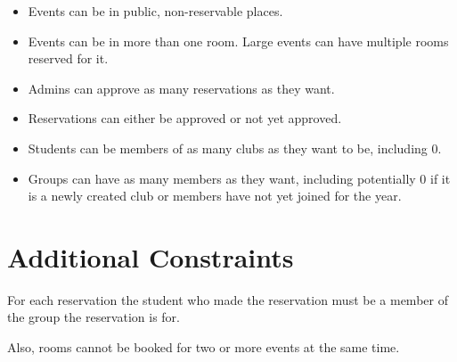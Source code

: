\documentclass{article}
\begin{document}
\begin{itemize}
\item Events can be in public, non-reservable places.
\item Events can be in more than one room. Large events can have multiple rooms
reserved for it.
\item Admins can approve as many reservations as they want.
\item Reservations can either be approved or not yet approved.
\item Students can be members of as many clubs as they want to be, including 0.
\item Groups can have as many members as they want, including potentially 0 if
it is a newly created club or members have not yet joined for the year.
\end{itemize}

\section{}

\section{Additional Constraints}
For each reservation the student who made the reservation must be a member of
the group the reservation is for. 

Also, rooms cannot be booked for two or more events at the same time.

\section{}
\end{document}
